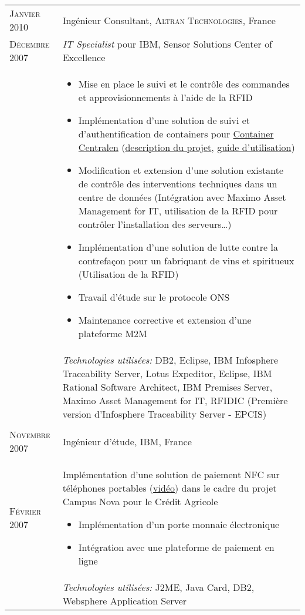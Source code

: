 \begin{longtable}{R{2.5cm}|p{14.8cm}}
 	\textsc{Janvier 2010} & Ingénieur Consultant, \textsc{Altran Technologies}, France\\
 	\textsc{Décembre 2007}& \emph{IT Specialist} pour IBM, Sensor Solutions Center of Excellence\\&
 	\footnotesize{
 		\begin{itemize}
 		  \item Mise en place le suivi et le contrôle des commandes et approvisionnements à l'aide de la RFID
 		  \item Implémentation d'une solution de suivi et d'authentification de containers pour \href{http://www.container-centralen.com/}{Container Centralen} (\href{http://www.container-centralen.co.uk/rfid/history.aspx}{description du projet}, \href{http://www.container-centralen.co.uk/rfid/user\%20guide\%20for\%20scanning.aspx}{guide d'utilisation})
 		  \item Modification et extension d'une solution existante de contrôle des interventions techniques dans un centre de données 
 	 	(Intégration avec Maximo Asset Management for IT, utilisation de la RFID pour contrôler l'installation des serveurs\ldots)
 	 	  \item Implémentation d'une solution de lutte contre la contrefaçon pour un fabriquant de vins et spiritueux (Utilisation de la RFID)
 	 	  \item Travail d'étude sur le protocole ONS
 	 	  \item Maintenance corrective et extension d'une plateforme M2M
 		\end{itemize}
 		\vspace{-1em}
 	}\\&
 	\footnotesize{\emph{Technologies utilisées:} DB2, Eclipse, IBM Infosphere Traceability Server, Lotus Expeditor, Eclipse, 
 	IBM Rational Software Architect, IBM Premises Server, Maximo Asset Management for IT, RFIDIC (Première version d'Infosphere Traceability Server - EPCIS) }\\
 \\
 	\textsc{Novembre 2007} & Ingénieur d'étude, \textsc{IBM}, France \\
 	\textsc{Février 2007}&
 	\footnotesize{
 	 	Implémentation d'une solution de paiement NFC sur téléphones portables (\href{http://www.nouvo.ch/s-007}{vidéo}) 
 	 	dans le cadre du projet Campus Nova pour le Crédit Agricole
 	 	\begin{itemize}
 	 	  \item Implémentation d'un porte monnaie électronique
 	 	  \item Intégration avec une plateforme de paiement en ligne
 	 	\end{itemize}
 	 	
	}\\&
	\vspace{-1em}
 	\footnotesize{\emph{Technologies utilisées:} J2ME, Java Card, DB2, Websphere Application Server}\\
\end{longtable}
